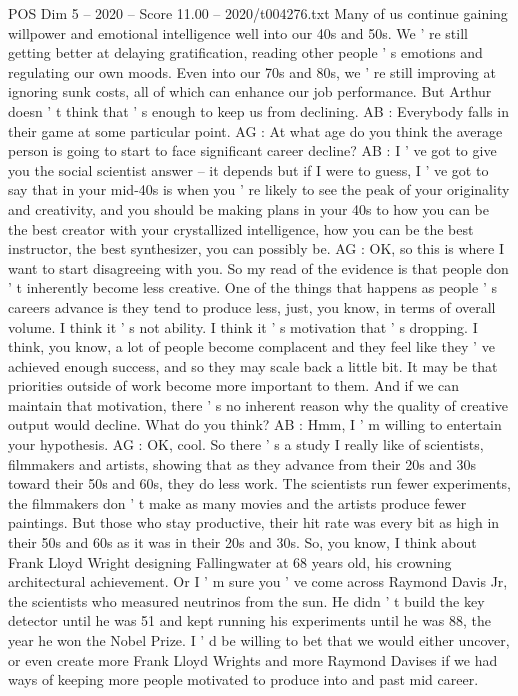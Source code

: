 \begin{textsample}{POS Dim 5 – 2020 – Score 11.00 – 2020/t004276.txt}
Many of us continue gaining willpower and emotional intelligence well into our 40s and 50s.
We ' re still getting better at delaying gratification, reading other people ' s emotions and regulating our own moods.
Even into our 70s and 80s, we ' re still improving at ignoring sunk costs, all of which can enhance our job performance.
But Arthur doesn ' t think that ' s enough to keep us from declining.
AB : Everybody falls in their game at some particular point.
AG : At what age do you think the average person is going to start to face significant career decline?
AB : I ' ve got to give you the social scientist answer -- it depends but if I were to guess, I ' ve got to say that in your mid-40s is when you ' re likely to see the peak of your originality and creativity, and you should be making plans in your 40s to how you can be the best creator with your crystallized intelligence, how you can be the best instructor, the best synthesizer, you can possibly be.
AG : OK, so this is where I want to start disagreeing with you.
So my read of the evidence is that people don ' t inherently become less creative.
One of the things that happens as people ' s careers advance is they tend to produce less, just, you know, in terms of overall volume.
I think it ' s not ability.
I think it ' s motivation that ' s dropping.
I think, you know, a lot of people become complacent and they feel like they ' ve achieved enough success, and so they may scale back a little bit.
It may be that priorities outside of work become more important to them.
And if we can maintain that motivation, there ' s no inherent reason why the quality of creative output would decline.
What do you think?
AB : Hmm, I ' m willing to entertain your hypothesis.
AG : OK, cool.
So there ' s a study I really like of scientists, filmmakers and artists, showing that as they advance from their 20s and 30s toward their 50s and 60s, they do less work.
The scientists run fewer experiments, the filmmakers don ' t make as many movies and the artists produce fewer paintings.
But those who stay productive, their hit rate was every bit as high in their 50s and 60s as it was in their 20s and 30s.
So, you know, I think about Frank Lloyd Wright designing Fallingwater at 68 years old, his crowning architectural achievement.
Or I ' m sure you ' ve come across Raymond Davis Jr, the scientists who measured neutrinos from the sun.
He didn ' t build the key detector until he was 51 and kept running his experiments until he was 88, the year he won the Nobel Prize.
I ' d be willing to bet that we would either uncover, or even create more Frank Lloyd Wrights and more Raymond Davises if we had ways of keeping more people motivated to produce into and past mid career.

\end{textsample}
